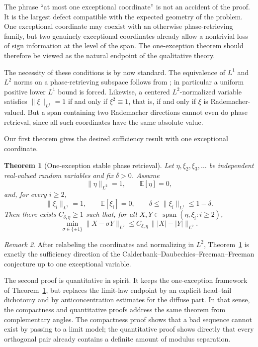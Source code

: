 \documentclass[11pt]{amsart}
\numberwithin{equation}{section}
\newtheorem{theorem}{Theorem}[section]
\theoremstyle{definition}
\theoremstyle{remark}
\newtheorem{remark}[theorem]{Remark}
\newcommand{\E}{\mathbb E}
\newcommand{\Span}{\operatorname{span}}
\newcommand{\abs}[1]{\lvert #1 \rvert}
\newcommand{\norm}[1]{\lVert #1 \rVert}
\begin{document}
The phrase ``at most one exceptional coordinate'' is not an accident of the
proof.  It is the largest defect compatible with the expected geometry of the
problem.  One exceptional coordinate may coexist with an otherwise
phase-retrieving family, but two genuinely exceptional coordinates already
allow a nontrivial loss of sign information at the level of the span.  The
one-exception theorem should therefore be viewed as the natural endpoint of the
qualitative theory.

The necessity of these conditions is by now standard.  The equivalence of
$L^1$ and $L^2$ norms on a phase-retrieving subspace follows from
\cite{FOTP}; in particular a uniform positive lower $L^1$ bound is forced.
Likewise, a centered $L^2$-normalized variable satisfies
$\norm{\xi}_{L^1}=1$ if and only if $\xi^2\equiv 1$, that is, if and only if
$\xi$ is Rademacher-valued.  But a span containing two Rademacher directions
cannot even do phase retrieval, since all such coordinates have the same
absolute value.

Our first theorem gives the desired sufficiency result with one exceptional
coordinate.

\begin{theorem}[One-exception stable phase retrieval]\label{thm:main}
Let $\eta,\xi_2,\xi_3,\dots$ be independent real-valued random variables and
fix $\delta>0$.  Assume
\[
\norm{\eta}_{L^2}=1,
\qquad
\E[\eta]=0,
\]
and, for every $i\ge2$,
\[
\norm{\xi_i}_{L^2}=1,
\qquad
\E[\xi_i]=0,
\qquad
\delta\le \norm{\xi_i}_{L^1}\le 1-\delta.
\]
Then there exists $C_{\delta,\eta}\ge1$ such that, for all
$X,Y\in \overline{\Span}(\eta,\xi_i:i\ge2)$,
\[
\min_{\sigma\in\{\pm1\}}\norm{X-\sigma Y}_{L^2}
\le
C_{\delta,\eta}\,\norm{\abs{X}-\abs{Y}}_{L^2}.
\]
\end{theorem}

\begin{remark}
After relabeling the coordinates and normalizing in $L^2$,
Theorem~\ref{thm:main} is exactly the sufficiency direction of the
Calderbank--Daubechies--Freeman--Freeman conjecture up to one exceptional
variable.
\end{remark}

The second proof is quantitative in spirit.  It keeps the one-exception
framework of Theorem~\ref{thm:main}, but replaces the limit-law endpoint by an
explicit head--tail dichotomy and by anticoncentration estimates for the
diffuse part.  In that sense, the compactness and quantitative proofs address
the same theorem from complementary angles.  The compactness proof shows that a
bad sequence cannot exist by passing to a limit model; the quantitative proof
shows directly that every orthogonal pair already contains a definite amount of
modulus separation.
\end{document}
